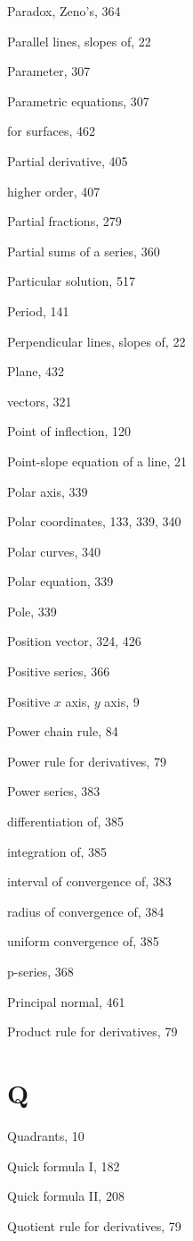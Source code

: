 \documentclass[10pt]{article}
\begin{document}
Paradox, Zeno's, 364

Parallel lines, slopes of, 22

Parameter, 307

Parametric equations, 307

for surfaces, 462

Partial derivative, 405

higher order, 407

Partial fractions, 279

Partial sums of a series, 360

Particular solution, 517

Period, 141

Perpendicular lines, slopes of, 22

Plane, 432

vectors, 321

Point of inflection, 120

Point-slope equation of a line, 21

Polar axis, 339

Polar coordinates, 133, 339, 340

Polar curves, 340

Polar equation, 339

Pole, 339

Position vector, 324, 426

Positive series, 366

Positive $x$ axis, $y$ axis, 9

Power chain rule, 84

Power rule for derivatives, 79

Power series, 383

differentiation of, 385

integration of, 385

interval of convergence of, 383

radius of convergence of, 384

uniform convergence of, 385

p-series, 368

Principal normal, 461

Product rule for derivatives, 79

\section*{Q}
Quadrants, 10

Quick formula I, 182

Quick formula II, 208

Quotient rule for derivatives, 79
\end{document}
